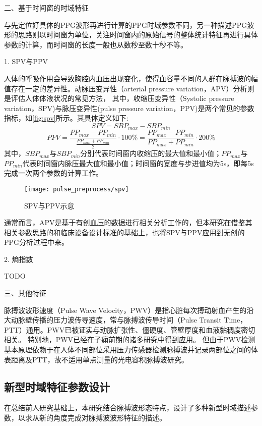 二、基于时间窗的时域特征

与先定位好具体的PPG波形再进行计算的PPG时域参数不同，另一种描述PPG波形的思路则以时间窗为单位，关注时间窗内的原始信号的整体统计特征再进行具体参数的计算，而时间窗的长度一般也从数秒至数十秒不等。

1. SPV与PPV

人体的呼吸作用会导致胸腔内血压出现变化，使得血容量不同的人群在脉搏波的幅值存在一定的差异性。动脉压变异性（arterial pressure variation，APV）分析则是评估人体体液状况的常见方法，
其中，收缩压变异性（Systolic pressure variation，SPV)与脉压变异性(pulse pressure variation，PPV)是两个常见的参数指标\cite{GE2021,Michard1999,Perel1987,Michard2005}，如\autoref{fig:spv}所示。其具体定义如下\cite{GE2021}:
\begin{equation}
    \label{equ:spv}
    SPV=SBP_{max}-SBP_{min}
\end{equation}
\begin{equation}
    \label{equ:ppv}
    PPV=\frac{PP_{max}-PP_{min}}{\frac{PP_{max}+PP_{min}}{2}}\cdot 100\%=\frac{PP_{max}-PP_{min}}{PP_{max}+PP_{min}}\cdot 200\%
\end{equation}
其中，$SBP_{max}$与$SBP_{min}$分别代表时间窗内收缩压的最大值和最小值；$PP_{max}$与$PP_{min}$代表时间窗内脉压最大值和最小值；时间窗的宽度与步进值均为5s，即每5s完成一次两个参数的计算工作。
\begin{figure}[htbp]
    \centering
    \texttt{[image: pulse\_preprocess/spv]}
    \caption{\label{fig:spv}SPV与PPV示意}
\end{figure}

通常而言，APV是基于有创血压的数据进行相关分析工作的，但本研究在借鉴其相关参数思路的和临床设备设计标准的基础上，也将SPV与PPV应用到无创的PPG分析过程中来。

2. 熵指数

TODO

三、其他特征

脉搏波波形速度（Pulse Wave Velocity，PWV）是指心脏每次搏动射血产生的沿大动脉壁传播的压力波传导速度，常与脉搏波传导时间（Pulse Transit Time，PTT）通用。PWV已被证实与动脉扩张性、僵硬度、管壁厚度和血液黏稠度密切相关。
特别地，PWV已经在子痫前期的诸多研究中得到应用\cite{Tomsin2012,Katsipi2014,VivianaIvan2018,Ira2014}。
但由于PWV检测基本原理依赖于在人体不同部位采用压力传感器检测脉搏波并记录两部位之间的体表距离及PTT，故不适用单点测量的光电容积脉搏波研究。

\subsection{新型时域特征参数设计}
在总结前人研究基础上，本研究结合脉搏波形态特点，设计了多种新型时域描述参数，以求从新的角度完成对脉搏波波形特征的描述。

